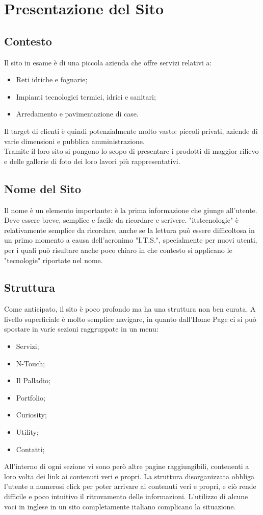 \section{Presentazione del Sito}
\subsection{Contesto}
Il sito in esame è di una piccola azienda che offre servizi relativi a:
\begin{itemize}
	\item Reti idriche e fognarie;
	\item Impianti tecnologici termici, idrici e sanitari;
	\item Arredamento e pavimentazione di case.
\end{itemize}
Il target di clienti è quindi potenzialmente molto vasto: piccoli privati, aziende di varie dimensioni e pubblica amministrazione. \\
Tramite il loro sito si pongono lo scopo di presentare i prodotti di maggior rilievo e delle gallerie di foto dei loro lavori più rappresentativi.

\subsection{Nome del Sito}
Il nome è un elemento importante: è la prima informazione che giunge all'utente. Deve essere breve, semplice e facile da ricordare e scrivere.
"itstecnologie" è relativamente semplice da ricordare, anche se la lettura può essere difficoltosa in un primo momento a causa dell'acronimo "I.T.S.", specialmente per nuovi utenti, per i quali può risultare anche poco chiaro in che contesto si applicano le "tecnologie" riportate nel nome.

\subsection{Struttura}\label{struttura}
Come anticipato, il sito è poco profondo ma ha una struttura non ben curata. A livello superficiale è molto semplice navigare, in quanto dall'Home Page ci si può spostare in varie sezioni raggruppate in un menu:
\begin{itemize}
	\item Servizi;
	\item N-Touch;
	\item Il Palladio;
	\item Portfolio;
	\item Curiosity;
	\item Utility;
	\item Contatti;
\end{itemize}
All'interno di ogni sezione vi sono però altre pagine raggiungibili, contenenti a loro volta dei link ai contenuti veri e propri. La struttura disorganizzata obbliga l'utente a numerosi click per poter arrivare ai contenuti veri e propri, e ciò rende difficile e poco intuitivo il ritrovamento delle informazioni. L'utilizzo di alcune voci in inglese in un sito completamente italiano complicano la situazione.
